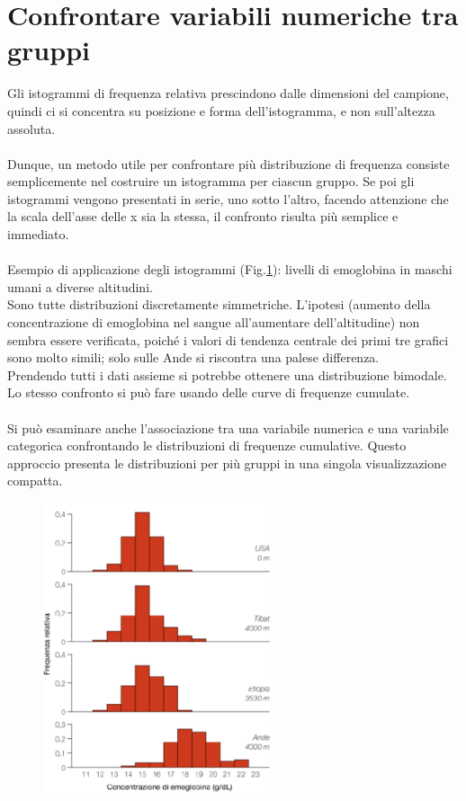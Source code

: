 \documentclass[10pt, draft]{book}
\begin{document}
\section{Confrontare variabili numeriche tra gruppi}
Gli istogrammi di frequenza relativa prescindono dalle dimensioni del campione, quindi ci si concentra su posizione e forma dell'istogramma, e non sull'altezza assoluta.
\\
\\
Dunque, un metodo utile per confrontare più distribuzione di frequenza consiste semplicemente nel costruire un istogramma per ciascun gruppo. Se poi gli istogrammi vengono presentati in serie, uno sotto l'altro, facendo attenzione che la scala dell'asse delle x sia la stessa, il confronto risulta più semplice e immediato.
\\
\\
Esempio di applicazione degli istogrammi (Fig.\ref{fig2.4-1}): livelli di emoglobina in maschi umani a diverse altitudini.\\
Sono tutte distribuzioni discretamente simmetriche. L'ipotesi (aumento della concentrazione di emoglobina nel sangue all'aumentare dell'altitudine) non sembra essere verificata, poiché i valori di tendenza centrale dei primi tre grafici sono molto simili; solo sulle Ande si riscontra una palese differenza.
\\
Prendendo tutti i dati assieme si potrebbe ottenere una distribuzione bimodale.
\\
Lo stesso confronto si può fare usando delle curve di frequenze cumulate.
\\
\\
Si può esaminare anche l'associazione tra una variabile numerica e una variabile categorica confrontando le distribuzioni di frequenze cumulative. Questo approccio presenta le distribuzioni per più gruppi in una singola visualizzazione compatta.
\clearpage
\begin{figure}[h]
    \centering
    \includegraphics[width=0.6\textwidth]{fig2.4-1}
    \caption{\small{}}
    \label{fig2.4-1}
\end{figure}
\end{document}
